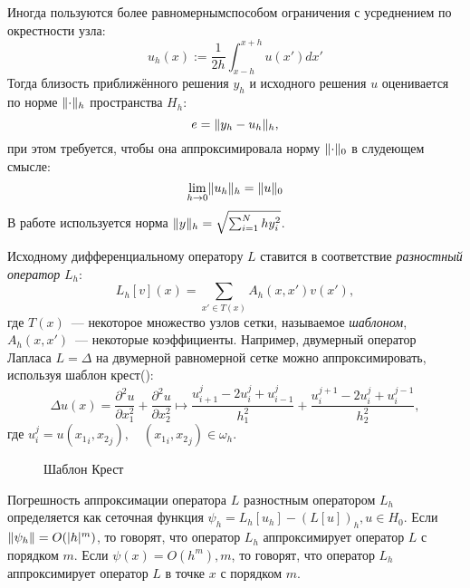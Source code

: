 Иногда пользуются \glqq более равномерным\grqq способом ограничения с усреднением по окрестности узла:
\begin{equation*}
    u_h(x) := \frac{1}{2h} \int_{x - h}^{x + h} u(x') dx'
\end{equation*}
Тогда близость приближённого решения $y_h$ и исходного решения $u$ оценивается по норме $\lVert\cdot\rVert_{h}$ пространства $H_h$:
\begin{equation*}
    e = \lVert y_h - u_h\rVert_{h},
\end{equation*}
при этом требуется, чтобы она аппроксимировала норму $\lVert\cdot\rVert_{0}$ в слудеющем смысле\cite{СамарскийТеорияРазностныхСхем}:
\begin{equation*}
    \lim\limits_{h \rightarrow 0} \lVert u_h\rVert_h = \lVert u\rVert_{0}
\end{equation*}
В работе используется норма
$
    \lVert y\rVert_{h} = \sqrt{
        \sum_{i=1}^{N} hy_i^2
    }
$.

Исходному дифференциальному оператору $L$ ставится в соответствие \emph{разностный оператор} $L_h$:
\begin{equation*}
    L_h[v] (x) = \sum_{x' \in T(x)} A_h(x, x') v(x'),
\end{equation*}
где $T(x)$~--- некоторое множество узлов сетки, называемое \emph{шаблоном}, $A_h(x, x')$~--- некоторые коэффициенты.
Например, двумерный оператор Лапласа $L = \Delta$ на двумерной равномерной сетке можно аппроксимировать, используя шаблон \glqq крест\grqq ():
\begin{equation*}
    \Delta u(x) = \frac{\partial^2 u}{\partial x_1^2} + \frac{\partial^2 u}{\partial x_2^2} \mapsto 
    \frac{u_{i+1}^{j} - 2u_{i}^{j} + u_{i-1}^j}{h_1^2} +
    \frac{u_i^{j + 1} - 2u_i^{j} + u_i^{j-1}}{h_2^2}, 
\end{equation*}
где $u_i^j = u({x_1}_i, {x_2}_j),\quad ({x_1}_i, {x_2}_j) \in \omega_h$.
\begin{figure}
    \centering
    \caption{Шаблон \glqq Крест\grqq}
    \label{fig:cross}
\end{figure}
Погрешность аппроксимации оператора $L$ разностным оператором $L_h$ определяется как сеточная функция $\psi_h = L_h[u_h] - (L[u])_h, u \in H_0$.
Если $\lVert\psi_h\rVert = O(|h|^m)$, то говорят, что оператор $L_h$ аппроксимирует оператор $L$ с порядком $m$.
Если $\psi(x) = O(h^m), m$, то говорят, что оператор $L_h$ аппроксимирует оператор $L$ в точке $x$ с порядком $m$.

